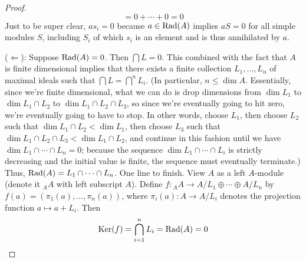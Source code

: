 \documentclass[../notes.tex]{subfiles}
\begin{document}
\begin{itemize}
\begin{proof}
\begin{equation*}
            = 0+\cdots+0
            = 0
        \end{equation*}
        Just to be super clear, $as_i=0$ because $a\in\operatorname{Rad}(A)$ implies $aS=0$ for all simple modules $S$, including $S_i$ of which $s_i$ is an element and is thus annihilated by $a$.\par
        ($\Leftarrow$): Suppose $\operatorname{Rad}(A)=0$. Then $\bigcap L=0$. This combined with the fact that $A$ is finite dimensional implies that there exists a finite collection $L_1,\dots,L_n$ of maximal ideals such that $\bigcap L=\bigcap^nL_i$. (In particular, $n\leq\dim A$. Essentially, since we're finite dimensional, what we can do is drop dimensions from $\dim L_1$ to $\dim L_1\cap L_2$ to $\dim L_1\cap L_2\cap L_3$, so since we're eventually going to hit zero, we're eventually going to have to stop. In other words, choose $L_1$, then choose $L_2$ such that $\dim L_1\cap L_2<\dim L_1$, then choose $L_3$ such that $\dim L_1\cap L_2\cap L_3<\dim L_1\cap L_2$, and continue in this fashion until we have $\dim L_1\cap\cdots\cap L_n=0$; because the sequence $\dim L_1\cap\cdots\cap L_i$ is strictly decreasing and the initial value is finite, the sequence must eventually terminate.) Thus, $\operatorname{Rad}(A)=L_1\cap\cdots\cap L_n$. One line to finish. View $A$ as a left $A$-module (denote it ${}_AA$ with left subscript $A$). Define $f:{}_AA\to A/L_1\oplus\cdots\oplus A/L_n$ by $f(a)=(\pi_1(a),\dots,\pi_n(a))$, where $\pi_i(a):A\to A/L_i$ denotes the projection function $a\mapsto a+L_i$. Then
        \begin{equation*}
            \ker(f) = \bigcap_{i=1}^nL_i = \Rad(A) = 0

\end{equation*}
\end{proof}
\end{itemize}
\end{document}
